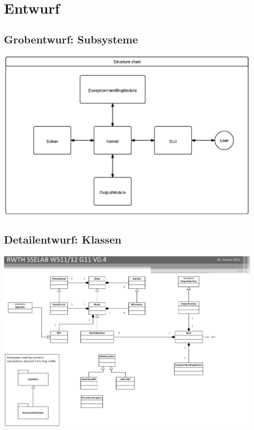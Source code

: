 \chapter{Entwurf}
\label{ch:3}

\section{Grobentwurf: Subsysteme}
\label{sec:3.1}
\includegraphics[width=6in,keepaspectratio=true]{figures/StructureDiagGyroSim.eps}



\section{Detailentwurf: Klassen}
\label{sec:3.2}
\includegraphics[width=6in,keepaspectratio=true]{figures/RWTH_SSELAB_WS1112_CLASSES.eps}


